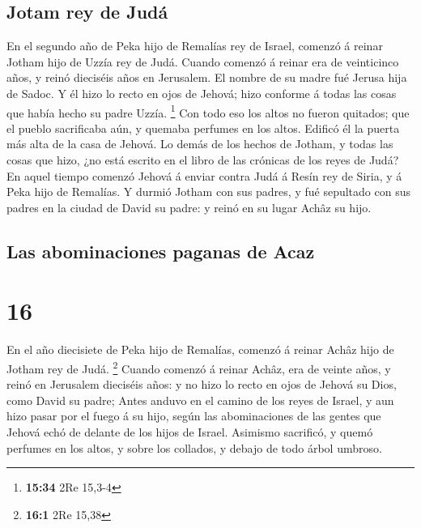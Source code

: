 \hypertarget{jotam-rey-de-juduxe1}{%
\subsection{Jotam rey de Judá}\label{jotam-rey-de-juduxe1}}

 En el segundo año de Peka hijo de Remalías rey de
Israel, comenzó á reinar Jotham hijo de Uzzía rey de Judá.
 Cuando comenzó á reinar era de veinticinco años, y reinó
dieciséis años en Jerusalem. El nombre de su madre fué Jerusa hija de
Sadoc.  Y él hizo lo recto en ojos de Jehová; hizo
conforme á todas las cosas que había hecho su padre Uzzía. \footnote{\textbf{15:34}
  2Re 15,3-4}  Con todo eso los altos no fueron quitados;
que el pueblo sacrificaba aún, y quemaba perfumes en los altos. Edificó
él la puerta más alta de la casa de Jehová.  Lo demás de
los hechos de Jotham, y todas las cosas que hizo, ¿no está escrito en el
libro de las crónicas de los reyes de Judá?  En aquel
tiempo comenzó Jehová á enviar contra Judá á Resín rey de Siria, y á
Peka hijo de Remalías.  Y durmió Jotham con sus padres, y
fué sepultado con sus padres en la ciudad de David su padre: y reinó en
su lugar Achâz su hijo.

\hypertarget{las-abominaciones-paganas-de-acaz}{%
\subsection{Las abominaciones paganas de
Acaz}\label{las-abominaciones-paganas-de-acaz}}

\hypertarget{section-15}{%
\section{16}\label{section-15}}

 En el año diecisiete de Peka hijo de Remalías, comenzó á
reinar Achâz hijo de Jotham rey de Judá. \footnote{\textbf{16:1} 2Re
  15,38}  Cuando comenzó á reinar Achâz, era de veinte
años, y reinó en Jerusalem dieciséis años: y no hizo lo recto en ojos de
Jehová su Dios, como David su padre;  Antes anduvo en el
camino de los reyes de Israel, y aun hizo pasar por el fuego á su hijo,
según las abominaciones de las gentes que Jehová echó de delante de los
hijos de Israel.  Asimismo sacrificó, y quemó perfumes en
los altos, y sobre los collados, y debajo de todo árbol umbroso.

